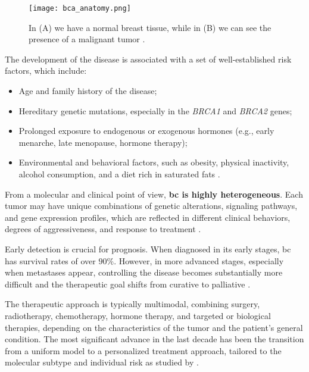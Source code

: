 \begin{figure}
  \centering
  \texttt{[image: bca\_anatomy.png]}
  \caption{In (A) we have a normal breast tissue, while in (B) we can see
    the presence of a malignant tumor \cite{bca_anatomy_figure_Muthu2020}.}
  \label{fig:breast_cancer_anatomy}
\end{figure}

The development of the disease is associated with a set of well-established
risk factors, which include:
\begin{itemize}
  \item Age and family history of the disease;
  \item Hereditary genetic mutations, especially in the \textit{BRCA1} and
        \textit{BRCA2} genes;
  \item Prolonged exposure to endogenous or exogenous hormones (e.g., early menarche,
        late menopause, hormone therapy);
  \item Environmental and behavioral factors, such as obesity, physical inactivity,
        alcohol consumption, and a diet rich in saturated fats
        \cite{BreastEpidemiology_Romanowicz2022,clinical_implication_bca_Adamo2015}.
\end{itemize}

From a molecular and clinical point of view, \textbf{\gls{bc} is highly
  heterogeneous}. Each tumor may have unique combinations of genetic alterations,
signaling pathways, and gene expression profiles, which are reflected in
different clinical behaviors, degrees of aggressiveness, and response to
treatment
\cite{origins_and_evolution_bca_Polyak2007,diff_bca_usa_Howlader2018}.

Early detection is crucial for prognosis. When diagnosed in its early stages,
\gls{bc} has survival rates of over $90\%$. However, in more advanced stages,
especially when metastases appear, controlling the disease becomes
substantially more difficult and the therapeutic goal shifts from curative to
palliative \cite{updatedbca_Hong2022Breast,clinical_implication_bca_Adamo2015}.

The therapeutic approach is typically multimodal, combining surgery,
radiotherapy, chemotherapy, hormone therapy, and targeted or biological
therapies, depending on the characteristics of the tumor and the patient's
general condition. The most significant advance in the last decade has been the
transition from a uniform model to a personalized treatment approach, tailored
to the molecular subtype and individual risk as studied by
\textcite{BreastEpidemiology_Romanowicz2022}.

